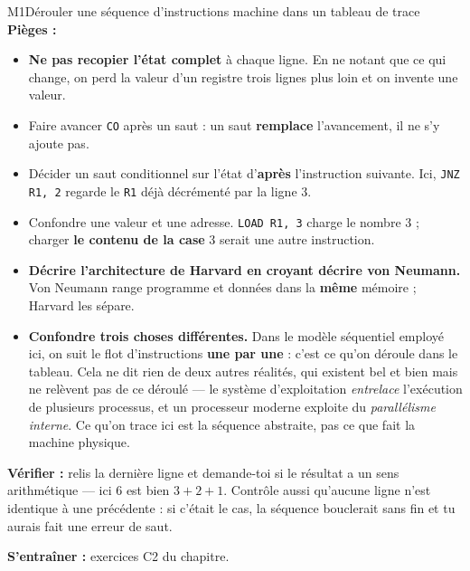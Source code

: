 \begin{fichemethode}{M1}{Dérouler une séquence d'instructions machine dans un tableau de trace}
\textbf{Pièges :}
\begin{itemize}
  \item \textbf{Ne pas recopier l'état complet} à chaque ligne. En ne notant que ce qui
    change, on perd la valeur d'un registre trois lignes plus loin et on invente une valeur.
  \item Faire avancer \lstinline{CO} après un saut : un saut \textbf{remplace} l'avancement,
    il ne s'y ajoute pas.
  \item Décider un saut conditionnel sur l'état d'\textbf{après} l'instruction suivante.
    Ici, \lstinline{JNZ R1, 2} regarde le \lstinline{R1} déjà décrémenté par la ligne $3$.
  \item Confondre une valeur et une adresse. \lstinline{LOAD R1, 3} charge le nombre $3$ ;
    charger \textbf{le contenu de la case} $3$ serait une autre instruction.
  \item \textbf{Décrire l'architecture de Harvard en croyant décrire von Neumann.} Von
    Neumann range programme et données dans la \textbf{même} mémoire ; Harvard les sépare.
  \item \textbf{Confondre trois choses différentes.} Dans le modèle séquentiel employé
    ici, on suit le flot d'instructions \textbf{une par une} : c'est ce qu'on déroule dans
    le tableau. Cela ne dit rien de deux autres réalités, qui existent bel et bien mais ne
    relèvent pas de ce déroulé — le système d'exploitation \emph{entrelace} l'exécution de
    plusieurs processus, et un processeur moderne exploite du \emph{parallélisme interne}.
    Ce qu'on trace ici est la séquence abstraite, pas ce que fait la machine physique.
\end{itemize}

\textbf{Vérifier :} relis la dernière ligne et demande-toi si le résultat a un sens
arithmétique — ici $6$ est bien $3+2+1$. Contrôle aussi qu'aucune ligne n'est identique à
une précédente : si c'était le cas, la séquence bouclerait sans fin et tu aurais fait une
erreur de saut.

\textbf{S'entraîner :} exercices C2 du chapitre.
\end{fichemethode}
